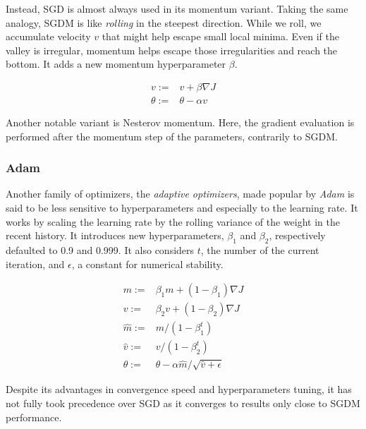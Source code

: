 Instead, \ac{SGD} is almost always used in its momentum variant. Taking the same analogy, \ac{SGDM} is like \emph{rolling} in the steepest direction. While we roll, we accumulate velocity $v$ that might help escape small local minima. Even if the valley is irregular, momentum helps escape those irregularities and reach the bottom. It adds a new momentum hyperparameter $\beta$.

\begin{equation}
\begin{split}
    v := & v + \beta \nabla J \\
    \theta := & \theta - \alpha v
\end{split}
\end{equation}

Another notable variant is Nesterov momentum. Here, the gradient evaluation is performed after the momentum step of the parameters, contrarily to SGDM.

\subsubsection{Adam}

Another family of optimizers, the \emph{adaptive optimizers}, made popular by \emph{\ac{Adam}} is said to be less sensitive to hyperparameters and especially to the learning rate. It works by scaling the learning rate by the rolling variance of the weight in the recent history. It introduces new hyperparameters, $\beta_1$ and $\beta_2$, respectively defaulted to 0.9 and 0.999. It also considers $t$, the number of the current iteration, and $\epsilon$, a constant for numerical stability.

\begin{equation}
\begin{split}
    m := & \beta_1 m + (1 - \beta_1) \nabla J \\
    v := & \beta_2 v + (1 - \beta_2) \nabla J \\
    \hat{m} := & m / (1 - \beta_1^t) \\
    \hat{v} := & v / (1 - \beta_2^t) \\
    \theta := & \theta - \alpha \hat{m} / \sqrt{\hat{v} + \epsilon}
\end{split}
\end{equation}

Despite its advantages in convergence speed and hyperparameters tuning, it has not fully took precedence over SGD as it converges to results only close to SGDM performance.

